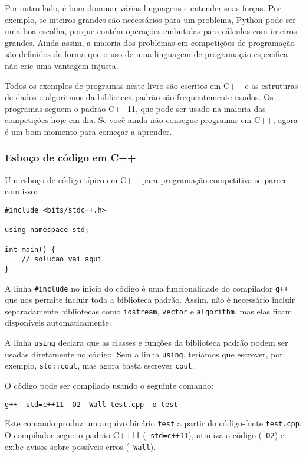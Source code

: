 Por outro lado, é bom dominar várias linguagens e entender suas forças. Por exemplo, se inteiros grandes são necessários para um problema, Python pode ser uma boa escolha, porque contém operações embutidas para cálculos com inteiros grandes. Ainda assim, a maioria dos problemas em competições de programação são definidos de forma que o uso de uma linguagem de programação específica não crie uma vantagem injusta.

Todos os exemplos de programas neste livro são escritos em C++ e as estruturas de dados e algoritmos da biblioteca padrão são frequentemente usados. Os programas seguem o padrão C++11, que pode ser usado na maioria das competições hoje em dia. Se você ainda não consegue programar em C++, agora é um bom momento para começar a aprender.

\subsubsection{Esboço de código em C++}

Um esboço de código típico em C++ para programação competitiva se parece com isso:

\begin{lstlisting}
#include <bits/stdc++.h>

using namespace std;

int main() {
    // solucao vai aqui
}
\end{lstlisting}

A linha \texttt{\#include} no inicio do código é uma funcionalidade do compilador \texttt{g++} que nos permite incluir toda a biblioteca padrão. Assim, não é necessário incluir separadamente bibliotecas como \texttt{iostream}, \texttt{vector} e \texttt{algorithm}, mas elas ficam disponíveis automaticamente.

A linha \texttt{using} declara que as classes e funções da biblioteca padrão podem ser usadas diretamente no código. Sem a linha \texttt{using}, teríamos que escrever, por exemplo, \texttt{std::cout}, mas agora basta escrever \texttt{cout}.

O código pode ser compilado usando o seguinte comando:

\begin{lstlisting}
g++ -std=c++11 -O2 -Wall test.cpp -o test
\end{lstlisting}

Este comando produz um arquivo binário \texttt{test} a partir do código-fonte \texttt{test.cpp}. O compilador segue o padrão C++11 (\texttt{-std=c++11}), otimiza o código (\texttt{-O2}) e exibe avisos sobre possíveis erros (\texttt{-Wall}).

